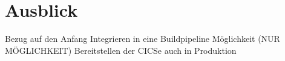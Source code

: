 \chapter{Ausblick}\label{ch:ausblick}

Bezug auf den Anfang
Integrieren in eine Buildpipeline
Möglichkeit (NUR MÖGLICHKEIT) Bereitstellen der CICSe auch in Produktion
